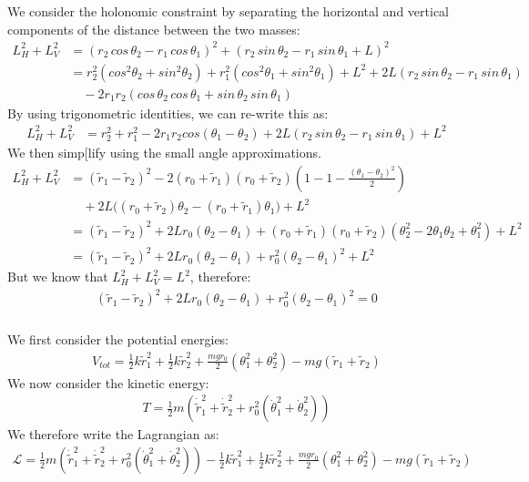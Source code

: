 \documentclass{article}
\begin{document}
We consider the holonomic constraint by separating the horizontal and vertical components of the distance between the two masses:
\begin{align*}
	L_H^2 + L_V^2 &= (r_2\,cos\,\theta_2 - r_1 \, cos \,\theta_1)^2 + (r_2\,sin\,\theta_2 - r_1\,sin\,\theta_1 + L)^2\\
	&= r_2^2 (cos^2\theta_2 + sin^2 \theta_2) + r_1^2(cos^2\theta_1 + sin^2 \theta_1) +L^2 + 2L(r_2\,sin\,\theta_2 - r_1\,sin\,\theta_1)\\ & \quad - 2r_1r_2(cos\,\theta_2\,cos\,\theta_1 + sin\,\theta_2\,sin\,\theta_1)
\end{align*}
By using trigonometric identities, we can re-write this as:
\begin{align*}
	L_H^2 + L_V^2 &=r_2^2+r_1^2 - 2r_1r_2cos(\theta_1 - \theta_2) + 2L(r_2\,sin\,\theta_2 - r_1\,sin\,\theta_1) + L^2
\end{align*}
We then simp[lify using the small angle approximations.
\begin{align*}
	L_H^2 + L_V^2 &= (\tilde{r}_1 -\tilde{r}_2)^2 - 2(r_0+\tilde{r}_1)(r_0 + \tilde{r}_2)(1 - 1 - \frac{(\theta_1 - \theta_2)^2}{2})\\ &\quad + 2L\big((r_0 + \tilde{r}_2)\theta_2 - (r_0 + \tilde{r}_1)\theta_1 \big) + L^2\\
 &= (\tilde{r}_1 -\tilde{r}_2)^2 + 2Lr_0(\theta_2 - \theta_1) + (r_0 + \tilde{r}_1)(r_0 + \tilde{r}_2)(\theta_2^2 -2\theta_1\theta_2 + \theta_1^2) +L^2\\
&=  (\tilde{r}_1 -\tilde{r}_2)^2 + 2Lr_0(\theta_2 - \theta_1) + r_0^2(\theta_2 - \theta_1)^2 + L^2
\end{align*}
But we know that $L_H^2 + L_V^2 = L^2$, therefore:
\begin{align*}
	(\tilde{r}_1 -\tilde{r}_2)^2 + 2Lr_0(\theta_2 - \theta_1) + r_0^2(\theta_2 - \theta_1)^2 = 0
\end{align*}

\subsubsection{} %

We first consider the potential energies:
\begin{align*}
	V_{tot} = \frac{1}{2}k\tilde{r}_1^2 + \frac{1}{2}k\tilde{r}_2^2 + \frac{mgr_0}{2}(\theta_1^2 + \theta^2_2) - mg(\tilde{r}_1 + \tilde{r}_2)
\end{align*}
We now consider the kinetic energy:
\begin{align*}
	T = \frac{1}{2}m(\dot{\tilde{r}}_1^2 + \dot{\tilde{r}}_2^2 + r_0^2(\dot{\theta}_1^2 + \dot{\theta}_2^2))
\end{align*}
We therefore write the Lagrangian as:
\begin{align*}
	\mathcal{L} = \frac{1}{2}m(\dot{\tilde{r}}_1^2 + \dot{\tilde{r}}_2^2 + r_0^2(\dot{\theta}_1^2 + \dot{\theta}_2^2)) - \frac{1}{2}k\tilde{r}_1^2 + \frac{1}{2}k\tilde{r}_2^2 + \frac{mgr_0}{2}(\theta_1^2 + \theta^2_2) - mg(\tilde{r}_1 + \tilde{r}_2)
\end{align*}
\end{document}
